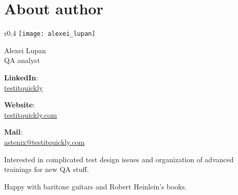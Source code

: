 \section*{About author}
\label{sec:About author}

\begingroup

\setlength{\intextsep}{-0.4em}
\setlength{\columnsep}{3em}

\begin{wrapfigure}[2]{r}{0.4\linewidth}
  \centering\texttt{[image: alexei\_lupan]}
\end{wrapfigure}

{\Large Alexei Lupan}\\
QA analyst

\textbf{LinkedIn}:\\
\href{https://www.linkedin.com/in/testitquickly/}{testitquickly}

\textbf{Website}:\\
\href{https://testitquickly.com/}{testitquickly.com}
 
\textbf{Mail}:\\
\href{mailto:astenix@testitquickly.com}{astenix@testitquickly.com} 


Interested in complicated test design issues and organization of advanced trainings for new QA stuff.

Happy with baritone guitars and Robert Heinlein's books.                                                                                                                                                                                                    

\endgroup

